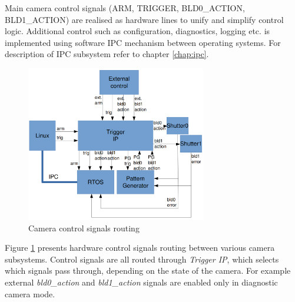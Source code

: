 
Main camera control signals (ARM, TRIGGER, BLD0\_ACTION, BLD1\_ACTION) are realised as hardware lines to unify and simplify control logic. Additional control such as configuration, diagnostics, logging etc. is implemented using software IPC mechanism between operating systems. For description of IPC subsystem refer to chapter \ref{chap:ipc}.

\begin{figure}[H]
\centering
\includegraphics[width=0.7\textwidth]{pict/cam_command.png}
\caption{Camera control signals routing}
\label{fig:camcmd}
\end{figure}

Figure \ref{fig:camcmd} presents hardware control signals routing between various camera subsystems. Control signals are all routed through \emph{Trigger IP}, which selects which signals pass through, depending on the state of the camera. For example external \emph{bld0\_action} and \emph{bld1\_action} signals are enabled only in diagnostic camera mode.

